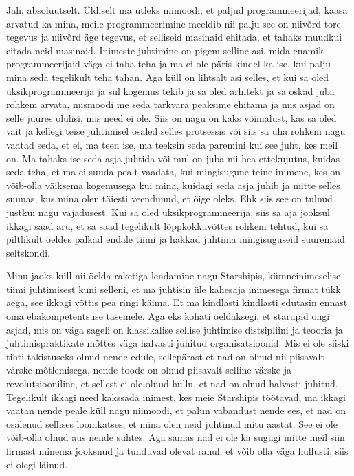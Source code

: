 
Jah, absoluutselt.  Üldiselt ma ütleks niimoodi, et paljud programmeerijad, 
kaasa arvatud ka mina, meile programmeerimine meeldib nii palju see on niivõrd 
tore tegevus ja niivõrd äge tegevus, et selliseid masinaid ehitada, et tahaks  
muudkui eitada neid masinaid. Inimeste juhtimine on pigem selline asi, mida 
enamik programmeerijaid väga ei taha teha ja ma ei ole päris kindel ka ise, kui 
palju mina seda tegelikult teha tahan. Aga küll on lihtsalt asi selles, et kui 
sa oled  üksikprogrammeerija ja sul kogemus tekib ja sa oled  arhitekt ja sa 
oskad juba rohkem  arvata, mismoodi me seda tarkvara peaksime ehitama ja mis 
asjad on selle juures olulisi, mis need ei ole. Siis on nagu on kaks võimalust, 
kas sa  oled vait ja kellegi teise juhtimisel osaled selles protsessis või siis 
sa üha rohkem nagu vaatad seda, et ei, ma teen ise, ma teeksin seda paremini 
kui see juht, kes meil on. Ma tahaks ise seda asja juhtida või mul on juba nii 
hea ettekujutus, kuidas seda teha, et ma ei suuda pealt vaadata, kui 
mingisugune teine inimene, kes on võib-olla väiksema kogemusega kui mina,  
kuidagi seda asja juhib ja mitte selles suunas, kus mina olen täiesti 
veendunud, et  õige oleks. Ehk siis see on tulnud justkui nagu vajadusest. Kui 
sa oled üksikprogrammeerija, siis sa aja jooksul ikkagi saad aru, et sa saad 
tegelikult lõppkokkuvõttes rohkem tehtud, kui sa piltlikult öeldes palkad 
endale tiimi ja hakkad juhtima mingisuguseid suuremaid seltskondi. 

Minu jaoks küll nii-öelda raketiga lendamine nagu Starshipis, kümneinimeselise 
tiimi juhtimisest kuni selleni, et ma juhtisin üle kahesaja inimesega firmat 
tükk aega, see ikkagi võttis pea ringi käima. Et ma kindlasti kindlasti 
edutasin ennast  oma ebakompetentsuse tasemele. Aga eks kohati öeldaksegi, et 
starupid ongi asjad, mis on väga sageli on  klassikalise sellise juhtimise 
distsipliini ja teooria ja juhtimispraktikate mõttes väga halvasti juhitud 
organisatsioonid. Mis ei ole siiski tihti takistuseks olnud nende edule, 
sellepärast et nad on olnud nii piisavalt värske mõtlemisega, nende toode on 
olnud piisavalt selline värske ja revolutsiooniline, et sellest ei ole olnud 
hullu, et nad on olnud halvasti juhitud. Tegelikult ikkagi need kakssada 
inimest, kes meie Starshipis töötavad,  ma ikkagi vaatan nende peale küll nagu 
niimoodi, et palun vabandust nende ees, et nad on osalenud sellises loomkatses, 
et mina olen neid juhtinud mitu aastat. See ei ole võib-olla olnud aus nende 
suhtes. Aga samas nad ei ole ka sugugi mitte meil siin firmast minema jooksnud 
ja tunduvad olevat rahul, et võib olla väga hullusti, siis ei olegi läinud.
